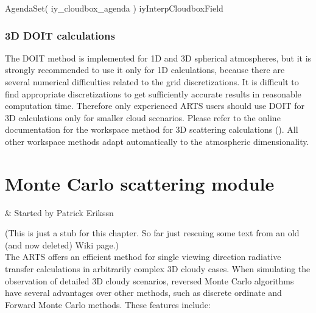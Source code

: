 \begin{code}
AgendaSet( iy_cloudbox_agenda ){
    iyInterpCloudboxField
}
\end{code}

\subsection{3D DOIT calculations}

The DOIT method is implemented for 1D and 3D spherical atmospheres, but it is
strongly recommended to use it only for 1D calculations, because there
are several numerical difficulties related to the grid
discretizations. It is difficult to find appropriate discretizations
to get sufficiently accurate results in reasonable computation
time. Therefore only experienced ARTS users should use DOIT for 3D
calculations only for smaller cloud scenarios. Please refer to the online
documentation for the workspace method for  3D scattering calculations
(). All other workspace
methods adapt automatically to the atmospheric dimensionality.





\chapter{Monte Carlo scattering module}
 \label{sec:mcscat}

 & Started by Patrick Erikssn\\ 
\stophistory

(This is just a stub for this chapter. So far just rescuing some text from an
old (and now deleted) Wiki page.)\\

\noindent
The ARTS  offers an efficient method
for single viewing direction radiative transfer calculations in arbitrarily
complex 3D cloudy cases. When simulating the observation of detailed 3D cloudy
scenarios, reversed Monte Carlo algorithms have several advantages over other
methods, such as discrete ordinate and Forward Monte Carlo methods. These
features include:

